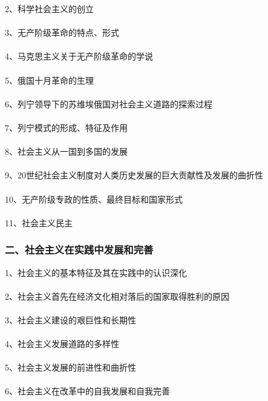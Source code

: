 \documentclass{ctexart}
\begin{document}
2、科学社会主义的创立
\\\\

3、无产阶级革命的特点、形式
\\\\

4、马克思主义关于无产阶级革命的学说
\\\\

5、俄国十月革命的生理
\\\\

6、列宁领导下的苏维埃俄国对社会主义道路的探索过程
\\\\

7、列宁模式的形成、特征及作用
\\\\

8、社会主义从一国到多国的发展
\\\\

9、20世纪社会主义制度对人类历史发展的巨大贡献性及发展的曲折性
\\\\

10、无产阶级专政的性质、最终目标和国家形式
\\\\

11、社会主义民主
\subsubsection{二、社会主义在实践中发展和完善}
1、社会主义的基本特征及其在实践中的认识深化
\\\\

2、社会主义首先在经济文化相对落后的国家取得胜利的原因
\\\\

3、社会主义建设的艰巨性和长期性
\\\\

4、社会主义发展道路的多样性
\\\\

5、社会主义发展的前进性和曲折性
\\\\

6、社会主义在改革中的自我发展和自我完善
\\\\
\end{document}
